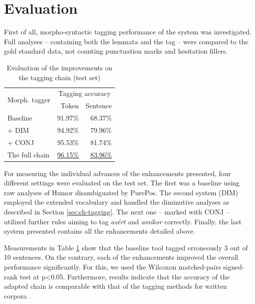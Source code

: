 \section{Evaluation}

First of all, morpho-syntactic tagging performance of the system was investigated. 
Full analyses -- containing both the lemmata and the tag -- were compared to the gold standard data, not counting punctuation marks and hesitation fillers.

\begin{table}[H]
\centering
\caption{Evaluation of the improvements on the tagging chain (test set)}
\label{tab:eval_tag}
\begin{tabular}{ l r r} 
\hline
\multicolumn{1}{l}{\multirow{2}{*}{Morph. tagger}} & \multicolumn{2}{c}{\hspace{0.8cm} Tagging accuracy} \\
& Token &  Sentence \\
\hline
Baseline &  \hspace{0.8cm} 91.97\%  & \hspace{0.8cm} 68.37\% \\
\hspace{0.2cm} + DIM &  94.92\% & 79.96\% \\
\hspace{0.2cm} + CONJ & 95.53\% & 81.74\% \\
The full chain & \underline{96.15\%} & \underline{83.96\%} \\

\hline
\end{tabular}
\end{table}

For measuring the individual advances of the enhancements presented, four different settings were evaluated on the test set. 
The first was a baseline using raw analyses of Humor disambiguated by PurePos. 
The second system (DIM) employed the extended vocabulary and handled the diminutive analyses as described in Section \ref{sec:ch-tagging}. 
The next one -- marked with CONJ -- utilized further rules aiming to tag \textit{azért} and \textit{amikor} correctly. 
Finally, the last system presented contains all the enhancements detailed above.

Measurements in Table \ref{tab:eval_tag} show that the baseline tool tagged erroneously 3 out of 10 sentences. 
On the contrary, each of the enhancements improved the overall performance significantly.
For this, we used the Wilcoxon matched-pairs signed-rank test at p<0.05. 
Furthermore, results indicate that the accuracy of the adapted chain is comparable with that of the tagging methods for written corpora \cite{zsibrata2013magyarlanc}. 

